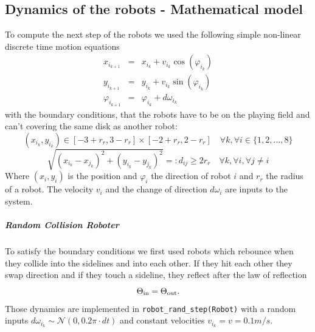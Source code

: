 \subsection*{Dynamics of the robots - Mathematical model}
To compute the next step of the robots we used the following simple non-linear discrete time motion equations
\begin{eqnarray*}
	x_{i_{k+1}} &=& x_{i_{k}} + v_{i_{k}} \cos(\varphi_{i_{k}}) \\
	y_{i_{k+1}} &=& y_{i_{k}} + v_{i_{k}} \sin(\varphi_{i_{k}}) \\
	\varphi_{i_{k+1}} &=& \varphi_{i_{k}} + d\omega_{i_k}
\end{eqnarray*}
with the boundary conditions, that the robots have to be on the playing field and can't covering the same disk as another robot:
	\[ (x_{i_{k}},y_{i_{k}}) \in [-3+r_r,3-r_r]\times[-2+r_r,2-r_r] \quad \forall k, \forall i\in \{1,2,\ldots,8 \}
	\]
	\[ \sqrt{(x_{i_{k}}-x_{j_{k}})^2 + (y_{i_{k}}-y_{j_{k}})^2} =: d_{ij} \geq 2r_r \quad \forall k, \forall i, \forall j\neq i
	\]
Where $(x_i,y_i)$ is the position and $\varphi_i$ the direction of robot $i$ and $r_r$ the radius of a robot. The velocity $v_i$ and the change of direction $d\omega_i$ are inputs to the system.

%

\subparagraph{Random Collision Roboter} To satisfy the boundary conditions we first used robots which rebounce when they collide into the sidelines and into each other. If they hit each other they swap direction 
%
and if they touch a sideline, they reflect after the law of reflection 
\[ \Theta_{\textnormal{in}} = \Theta_{\textnormal{out}}.
\]
Those dynamics are implemented in \texttt{robot\_rand\_step(Robot)} with a random inputs $d\omega_{i_k} \sim \mathcal{N}(0,0.2\pi \cdot dt)$ and constant velocities $v_{i_k} = v = 0.1 m/s$.\\

